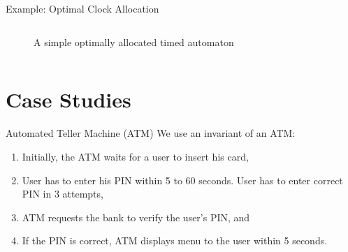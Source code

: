 \documentclass[10pt]{beamer}
\theoremstyle{plain}
\theoremstyle{definition}
\begin{document}
\begin{frame}{Example: Optimal Clock Allocation}
\begin{columns}
\begin{column}{0.5\textwidth}
\begin{figure}
\begin{adjustbox}{max totalsize={.99\textwidth}{.75\textheight},center}
				\end{adjustbox}
			\caption{A simple optimally allocated timed automaton}
			\end{figure}
		\end{column}
	\end{columns}
\end{frame}

\section{Case Studies}

\begin{frame}{Automated Teller Machine (ATM)}
	We use an invariant of an ATM:
	\begin{enumerate}
		\item Initially, the ATM waits for a user to insert his card,
		\item User has to enter his PIN within 5 to 60 seconds. User has to enter correct PIN in 3 attempts,
		\item ATM requests the bank to verify the user's PIN, and
		\item If the PIN is correct, ATM displays menu to the user within 5 seconds.
	\end{enumerate}
\end{frame}
\end{document}
